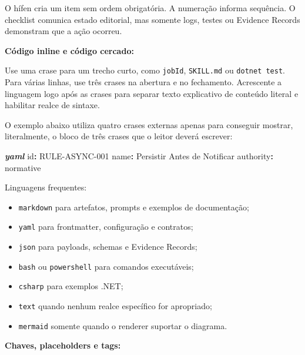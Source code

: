\documentclass[
  10pt,
  a4paper,
  oneside]{book}
\newenvironment{Shaded}{}{}
\newcommand{\AttributeTok}[1]{\textcolor[rgb]{0.49,0.56,0.16}{#1}}
\newcommand{\FunctionTok}[1]{\textcolor[rgb]{0.02,0.16,0.49}{#1}}
\newcommand{\InformationTok}[1]{\textcolor[rgb]{0.38,0.63,0.69}{\textbf{\textit{#1}}}}
\newcommand{\KeywordTok}[1]{\textcolor[rgb]{0.00,0.44,0.13}{\textbf{#1}}}
\providecommand{\tightlist}{%
  \setlength{\itemsep}{0pt}\setlength{\parskip}{0pt}}
\begin{document}
O hífen cria um item sem ordem obrigatória. A numeração informa
sequência. O checklist comunica estado editorial, mas somente logs,
testes ou Evidence Records demonstram que a ação ocorreu.

\textbf{Código inline e código cercado:}

Use uma crase para um trecho curto, como
\texttt{\textasciigrave{}jobId\textasciigrave{}},
\texttt{\textasciigrave{}SKILL.md\textasciigrave{}} ou
\texttt{\textasciigrave{}dotnet\ test\textasciigrave{}}. Para várias
linhas, use três crases na abertura e no fechamento. Acrescente a
linguagem logo após as crases para separar texto explicativo de conteúdo
literal e habilitar realce de sintaxe.

O exemplo abaixo utiliza quatro crases externas apenas para conseguir
mostrar, literalmente, o bloco de três crases que o leitor deverá
escrever:

\begin{Shaded}
\begin{Highlighting}[]
\InformationTok{\textasciigrave{}\textasciigrave{}\textasciigrave{}yaml}
\FunctionTok{id}\KeywordTok{:}\AttributeTok{ RULE{-}ASYNC{-}001}
\FunctionTok{name}\KeywordTok{:}\AttributeTok{ Persistir Antes de Notificar}
\FunctionTok{authority}\KeywordTok{:}\AttributeTok{ normative}
\InformationTok{\textasciigrave{}\textasciigrave{}\textasciigrave{}}
\end{Highlighting}
\end{Shaded}

Linguagens frequentes:

\begin{itemize}
\tightlist
\item
  \texttt{markdown} para artefatos, prompts e exemplos de documentação;
\item
  \texttt{yaml} para frontmatter, configuração e contratos;
\item
  \texttt{json} para payloads, schemas e Evidence Records;
\item
  \texttt{bash} ou \texttt{powershell} para comandos executáveis;
\item
  \texttt{csharp} para exemplos .NET;
\item
  \texttt{text} quando nenhum realce específico for apropriado;
\item
  \texttt{mermaid} somente quando o renderer suportar o diagrama.
\end{itemize}

\textbf{Chaves, placeholders e tags:}
\end{document}
